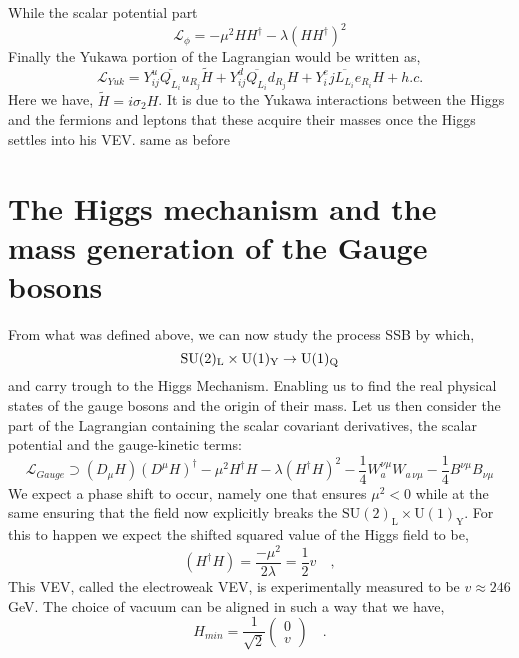 %
While the scalar potential part 
%
\begin{equation}
\mathcal{L}_{\phi} = -\mu^2 H H^\dagger - \lambda (H H^\dagger)^2
\end{equation}
Finally the Yukawa portion of the Lagrangian would be written as, 
\begin{equation}
\label{eq:YukawaSM}
\mathcal{L}_{Yuk} = Y^u_{ij} \overline{Q_{L_i}} u_{R_j}  \tilde{H} + Y^d_{ij} \overline{Q_{L_i}}  d_{R_j} H  + Y^e_ij \overline{L_{L_i}}  e_{R_i} H + h.c. 
\end{equation}
%
Here we have, $\tilde{H}=i\sigma_2 H$.
%
{ \color{gray} It is due to the Yukawa interactions between the Higgs and the fermions and leptons that these acquire their masses once the Higgs settles into his VEV. } { \color{blue} same as before }

\renewcommand{\cleardoublepage}{}
\renewcommand{\clearpage}{}

\section{The Higgs mechanism and the mass generation of the Gauge bosons}

From what was defined above, we can now study the process SSB by which, 
%
\begin{equation}
\mathrm{SU}(2)_{\mathrm{L}}\times\mathrm{U}(1)_{\mathrm{Y}} \rightarrow \mathrm{U}(1)_{\mathrm{Q}}
\end{equation} 
%
and carry trough to the Higgs Mechanism. Enabling us to find the real physical states of the gauge bosons and the origin of their mass. Let us then consider the part of the Lagrangian containing the scalar covariant derivatives, the scalar potential and the gauge-kinetic terms:
%
\begin{equation}
\mathcal{L}_{Gauge} \supset (D_\mu H)(D^\mu H)^\dagger - \mu^2 H^\dagger H - \lambda (H^\dagger H)^2 - \frac{1}{4}  W^{\nu \mu}_a W_{a \,\nu \mu}  
- \frac{1}{4}  B^{\nu \mu} B_{\nu \mu}
\label{eq:GaugeSM}
\end{equation} 
% 
We expect a phase shift to occur, namely one that ensures $\mu^2 < 0$ while at the same ensuring that the field now explicitly breaks the $\mathrm{SU(2)_L \times U(1)_Y}$. For this to happen we expect the shifted squared value of the Higgs field to be,
%
\begin{equation}
(H^\dagger H) = \frac{-\mu^2}{2\lambda} = \frac{1}{2} v  \quad , 
\end{equation} 
This VEV, called the electroweak VEV, is experimentally measured to be $v \approx 246$ GeV. 
%
The choice of vacuum can be aligned in such a way that we have,
\begin{equation}
H_{min} = \frac{1}{\sqrt{2}} \begin{pmatrix} 0 \\
v 
\end{pmatrix} \quad .
\end{equation}

